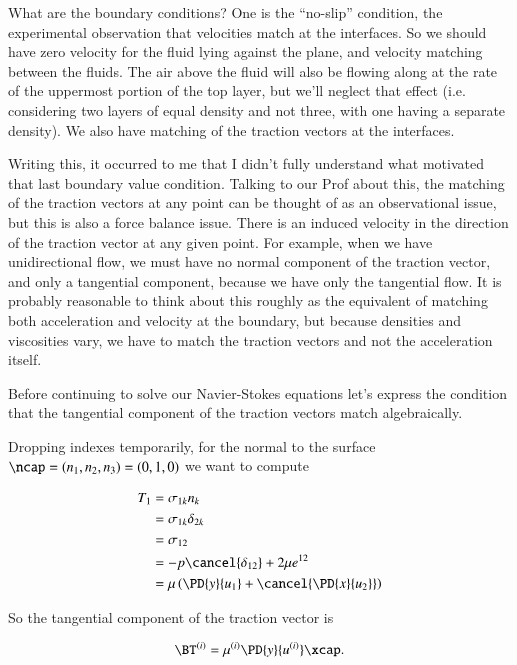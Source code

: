 What are the boundary conditions?  One is the ``no-slip'' condition, the experimental observation that velocities match at the interfaces.  So we should have zero velocity for the fluid lying against the plane, and velocity matching between the fluids.  The air above the fluid will also be flowing along at the rate of the uppermost portion of the top layer, but we'll neglect that effect (i.e. considering two layers of equal density and not three, with one having a separate density).  We also have matching of the traction vectors at the interfaces.  

Writing this, it occurred to me that I didn't fully understand what motivated that last boundary value condition.  Talking to our Prof about this, the matching of the traction vectors at any point can be thought of as an observational issue, but this is also a force balance issue.  There is an induced velocity in the direction of the traction vector at any given point.  For example, when we have unidirectional flow, we must have no normal component of the traction vector, and only a tangential component, because we have only the tangential flow.  It is probably reasonable to think about this roughly as the equivalent of matching both acceleration and velocity at the boundary, but because densities and viscosities vary, we have to match the traction vectors and not the acceleration itself.

Before continuing to solve our Navier-Stokes equations let's express the condition that the tangential component of the traction vectors match algebraically.

Dropping indexes temporarily, for the normal to the surface $\ncap = (n_1, n_2, n_3) = (0, 1, 0)$ we want to compute

\begin{align*}
T_1 
&= \sigma_{1 k} n_k \\
&= \sigma_{1 k} \delta_{2 k} \\
&= \sigma_{1 2} \\
&= -p \cancel{\delta_{1 2}} + 2 \mu e^{1 2} \\
&= \mu \left( \PD{y}{u_1} + \cancel{\PD{x}{u_2}} \right) 
\end{align*}

So the tangential component of the traction vector is

\begin{equation}\label{eqn:twoLayerInclinedFlow:90}
\BT^{(i)} = \mu^{(i)} \PD{y}{u^{(i)}} \xcap.
\end{equation}

